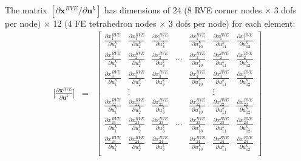 The matrix $[\partial \pmb{x}^{RVE}/\partial \pmb{u}^k]$ has dimensions of 24 (8 RVE corner nodes $\times$ 3 dofs per node) $\times$ 12 (4 FE tetrahedron nodes $\times$ 3 dofs per node) for each element: 
%
\setcounter{MaxMatrixCols}{12}
\begin{eqnarray}
\bigg[ \frac{\partial \pmb{x}^{RVE}}{\partial \pmb{u}^k} \bigg] &=& 
\begin{bmatrix}
\frac{\partial x_1^{RVE}}{\partial u_1^k} & \frac{\partial x_1^{RVE}}{\partial u_2^k} & \frac{\partial x_1^{RVE}}{\partial u_3^k} & &
%
 \frac{\partial x_1^{RVE}}{\partial u_{10}^k} & \frac{\partial x_1^{RVE}}{\partial u_{11}^k} & \frac{\partial x_1^{RVE}}{\partial u_{12}^k} \\
\frac{\partial x_2^{RVE}}{\partial u_1^k} & \frac{\partial x_2^{RVE}}{\partial u_2^k} & \frac{\partial x_2^{RVE}}{\partial u_3^k} & \cdots &
%
\frac{\partial x_2^{RVE}}{\partial u_{10}^k} & \frac{\partial x_2^{RVE}}{\partial u_{11}^k} & \frac{\partial x_2^{RVE}}{\partial u_{12}^k} \\
\frac{\partial x_3^{RVE}}{\partial u_1^k} & \frac{\partial x_3^{RVE}}{\partial u_2^k} & \frac{\partial x_3^{RVE}}{\partial u_3^k} &  &
%
\frac{\partial x_3^{RVE}}{\partial u_{10}^k} & \frac{\partial x_3^{RVE}}{\partial u_{11}^k} & \frac{\partial x_3^{RVE}}{\partial u_{12}^k} \\
 & \vdots & & & & \vdots & \\
\frac{\partial x_{22}^{RVE}}{\partial u_1^k} & \frac{\partial x_{22}^{RVE}}{\partial u_2^k} & \frac{\partial x_{22}^{RVE}}{\partial u_3^k} & &
%
 \frac{\partial x_{22}^{RVE}}{\partial u_{10}^k} & \frac{\partial x_{22}^{RVE}}{\partial u_{11}^k} & \frac{\partial x_{22}^{RVE}}{\partial u_{12}^k} \\
\frac{\partial x_{23}^{RVE}}{\partial u_1^k} & \frac{\partial x_{23}^{RVE}}{\partial u_2^k} & \frac{\partial x_{23}^{RVE}}{\partial u_3^k} & \cdots &
%
\frac{\partial x_{23}^{RVE}}{\partial u_{10}^k} & \frac{\partial x_{23}^{RVE}}{\partial u_{11}^k} & \frac{\partial x_{23}^{RVE}}{\partial u_{12}^k} \\
\frac{\partial x_{24}^{RVE}}{\partial u_1^k} & \frac{\partial x_{24}^{RVE}}{\partial u_2^k} & \frac{\partial x_{24}^{RVE}}{\partial u_3^k} &  &
%
\frac{\partial x_{24}^{RVE}}{\partial u_{10}^k} & \frac{\partial x_{24}^{RVE}}{\partial u_{11}^k} & \frac{\partial x_{24}^{RVE}}{\partial u_{12}^k} \\
\end{bmatrix} \nonumber\\

\end{eqnarray}
